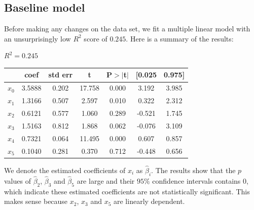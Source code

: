 \documentclass{article}
\begin{document}
\subsection{Baseline model}
Before making any changes on the data set, we fit a multiple linear model with an unsurprisingly low $R^2$ score of $0.245$. Here is a summary of the results:\\
\begin{center}
$R^2 = 0.245$\\
 \begin{tabular}{lcccccc}
 \hline
           & \textbf{coef} & \textbf{std err} & \textbf{t} & \textbf{P$> |$t$|$} & \textbf{[0.025} & \textbf{0.975]}  \\
\midrule
\textbf{$x_0$} &       3.5888  &        0.202     &    17.758  &         0.000        &        3.192    &        3.985     \\
\textbf{$x_1$} &       1.3166  &        0.507     &     2.597  &         0.010        &        0.322    &        2.312     \\
\textbf{$x_2$} &       0.6121  &        0.577     &     1.060  &         0.289        &       -0.521    &        1.745     \\
\textbf{$x_3$} &       1.5163  &        0.812     &     1.868  &         0.062        &       -0.076    &        3.109     \\
\textbf{$x_4$} &       0.7321  &        0.064     &    11.495  &         0.000        &        0.607    &        0.857     \\
\textbf{$x_5$} &       0.1040  &        0.281     &     0.370  &         0.712        &       -0.448    &        0.656     \\
\bottomrule
\end{tabular}
\end{center}
We denote the estimated coefficients of $x_i$ as $\hat{\beta}_i$. The results show that the $p$ values of $\hat{\beta}_2$, $\hat{\beta}_3$ and $\hat{\beta}_5$ are large and their $95\%$ confidence intervals contains 0, which indicate these estimated coefficients are not statistically significant. This makes sense because $x_2$, $x_3$ and $x_5$ are linearly dependent. 
\end{document}
